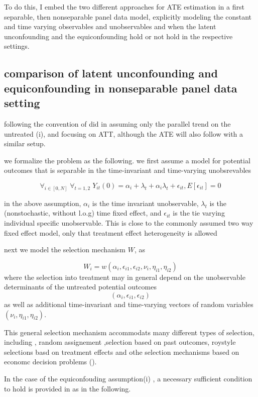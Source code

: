 \documentclass{article}
\begin{document}
To do this, I embed the two different approaches for ATE estimation in a first separable, then nonseparable panel data model, explicitly modeling the constant and time varying observables and unobservables and when the latent unconfounding and the equiconfounding hold or not hold in the respective settings.  





\subsection{comparison of latent unconfounding and equiconfounding in nonseparable panel data setting}

 following the convention of did in assuming only the parallel trend on the untreated (i), and focusing on ATT, although the ATE will also follow with a similar setup.
 
 we formalize the problem as the following.
 we first assume a model for potential outcomes that is separable in the time-invariant and time-varying unobsrevables
\begin{assumption}
    \[\forall_{i\in[0,N]}\;\forall_{t=1,2}\;Y_{it} ( 0) = \alpha_i + \lambda_t + \alpha_i \lambda_t +\epsilon_{it}  , E[ \epsilon_{it} ] = 0\]
 \end{assumption}
 in the above assumption, $\alpha_i$ is the time invariant unobservable, $\lambda_t$ is the (nonstochastic, without l.o.g) time fixed effect, and $\epsilon_{it} $ is the tie varying individual specific unobservable. This is close to the commonly assumed two way fixed effect model, only that treatment effect heterogeneity is allowed
 
 next we model the selection mechanism $W$, as 

\[W_i = w( \alpha_i, \epsilon_{i1}, \epsilon_{i2}, \nu_i, \eta_{i1}, \eta_{i2} )\]
where the selection into treatment may in general   depend on the unobservable determinants of the untreated potential outcomes
 \[(\alpha_i, \epsilon_{i1}, \epsilon_{i2} )\]
as well as additional time-invariant and time-varying vectors of random variables $ (\nu_i, \eta_{i1}, \eta_{i2} )$.

 This general selection mechanism accommodats many different types of selection, including , random assignement ,selection based on past outcomes, roystyle selections basd on treatment effects and othe selection mechanisms based on economc decision problems (\cite{heckman and robb}).
 
 In the case of the equiconfouding assumption(i) , a necessary sufficient condition to hold is provided in \cite{ghanem et al} as in the following.
 
\end{document}
